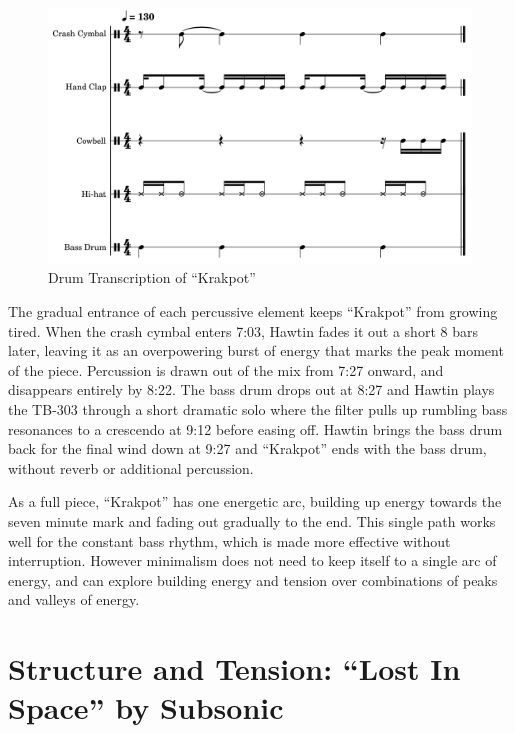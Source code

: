 \documentclass[12pt,twoside]{reedthesis}
\begin{document}
\begin{figure}[htbp]
	\begin{centering}
		\includegraphics[width=6in]{./Images/Krakpot_Drums2}
		\caption{Drum Transcription of ``Krakpot''}
		\label{fig:krakpot_drums}
	\end{centering}
\end{figure}

The gradual entrance of each percussive element keeps ``Krakpot'' from growing tired. When the crash cymbal enters 7:03, Hawtin fades it out a short 8 bars later, leaving it as an overpowering burst of energy that marks the peak moment of the piece. Percussion is drawn out of the mix from 7:27 onward, and disappears entirely by 8:22. The bass drum drops out at 8:27 and Hawtin plays the TB-303 through a short dramatic solo where the filter pulls up rumbling bass resonances to a crescendo at 9:12 before easing off. Hawtin brings the bass drum back for the final wind down at 9:27 and ``Krakpot'' ends with the bass drum, without reverb or additional percussion.

As a full piece, ``Krakpot'' has one energetic arc, building up energy towards the seven minute mark and fading out gradually to the end. This single path works well for the constant bass rhythm, which is made more effective without interruption. However minimalism does not need to keep itself to a single arc of energy, and can explore building energy and tension over combinations of peaks and valleys of energy.

\newpage
\section{Structure and Tension: ``Lost In Space'' by Subsonic}
\label{sec:lostinspace}
\end{document}
